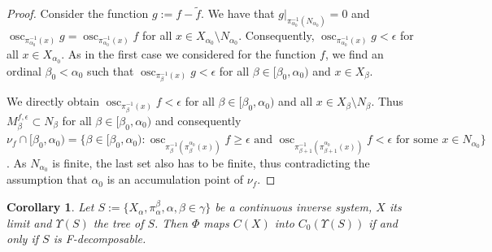 \documentclass[11pt]{article}
\DeclareMathOperator{\osc}{osc}
\newtheorem{corollary}[theorem]{Corollary}
\theoremstyle{definition}
\theoremstyle{remark}
\begin{document}
\begin{proof}
	Consider the function $g := f - \tilde{f}$. We have that $g\vert_{\pi_{\alpha_0}^{-1}(N_{\alpha_0})} = 0$ and $\osc_{\pi_{\alpha_0}^{-1}(x)} g = \osc_{\pi_{\alpha_0}^{-1}(x)} f$ for all $x \in X_{\alpha_0} \setminus N_{\alpha_0}$. Consequently, $\osc_{\pi_{\alpha_0}^{-1}(x)} g < \epsilon$ for all $x \in X_{\alpha_0}$. As in the first case we considered for the function $f$, we find an ordinal $\beta_0 < \alpha_0$ such that $\osc_{\pi_\beta^{-1}(x)} g < \epsilon$ for all $\beta \in [\beta_0, \alpha_0)$ and $x \in X_\beta$.
	
	We directly obtain $\osc_{\pi_\beta^{-1}(x)} f < \epsilon$ for all $\beta \in [\beta_0, \alpha_0)$ and all $x \in X_\beta \setminus N_\beta$. Thus $M^{f, \epsilon}_\beta \subset N_\beta$ for all $\beta \in [\beta_0, \alpha_0)$ and consequently $\nu_f \cap [\beta_0, \alpha_0) = \{\beta \in [\beta_0, \alpha_0): \osc_{\pi_\beta^{-1}(\pi^{\alpha_0}_\beta(x))} f \geq \epsilon \text{ and } \osc_{\pi_{\beta+1}^{-1}(\pi^{\alpha_0}_{\beta+1}(x))} f < \epsilon \text{ for some } x \in N_{\alpha_0}\}$. As $N_{\alpha_0}$ is finite, the last set also has to be finite, thus contradicting the assumption that $\alpha_0$ is an accumulation point of $\nu_f$. 
\end{proof}

\begin{corollary} \label{charact_tree}
	Let $S := \{X_\alpha, \pi_\alpha^\beta, \alpha, \beta \in \gamma\}$ be a continuous inverse system, $X$ its limit and $\Upsilon(S)$ the tree of $S$. Then $\Phi$ maps $C(X)$ into $C_0(\Upsilon(S))$ if and only if $S$ is F-decomposable.
\end{corollary}
\end{document}
